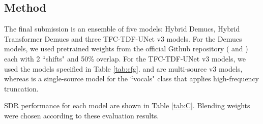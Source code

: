 \documentclass[10pt]{article}
\begin{document}
\subsection{Method}
\label{ssec:c_method}
The final submission is an ensemble of five models: Hybrid Demucs\cite{hdemucs}, Hybrid Transformer Demucs\cite{htdemucs} and three TFC-TDF-UNet v3 models. For the Demucs models, we used pretrained weights from the official Github repository\footnotemark[4] ( and ) each with 2 ``shifts" and 50\% overlap. For the TFC-TDF-UNet v3 models, we used the models specified in Table \ref{tab:cfg}.  and  are multi-source v3 models, whereas  is a single-source model for the ``vocals" class that applies high-frequency truncation\cite{mdxnet}.



SDR performance for each model are shown in Table \ref{tab:C}. Blending\cite{blend} weights were chosen according to these evaluation results. 







\end{document}
